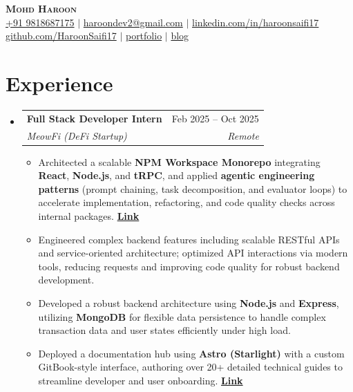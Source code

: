 \documentclass[letterpaper,11pt]{article}
\makeatletter
\newcommand{\resumeItem}[1]{
  \item\small{
    {#1 \vspace{-2pt}}
  }
}
\newcommand{\resumeSubheading}[4]{
  \vspace{-2pt}\item
    \begin{tabular*}{0.97\textwidth}[t]{l@{\extracolsep{\fill}}r}
      \textbf{#1} & #2 \\
      \textit{\small#3} & \textit{\small #4} \\
    \end{tabular*}\vspace{-7pt}
}
\newcommand{\resumeSubHeadingListStart}{\begin{itemize}[leftmargin=0.15in, label={}]}
\newcommand{\resumeSubHeadingListEnd}{\end{itemize}}
\newcommand{\resumeItemListStart}{\begin{itemize}}
\newcommand{\resumeItemListEnd}{\end{itemize}\vspace{-5pt}}
\makeatother
\begin{document}
\begin{center}
    \textbf{\Huge \scshape Mohd Haroon} \\ \vspace{3pt}
    \small \href{tel:+919818687175}{+91 9818687175} $|$
    \href{mailto:haroondev2@gmail.com}{haroondev2@gmail.com} $|$
    \href{https://linkedin.com/in/haroonsaifi17}{linkedin.com/in/haroonsaifi17} \\ \vspace{2pt}
    \href{https://github.com/HaroonSaifi17}{github.com/HaroonSaifi17} $|$
    \href{https://portfolio-v4-roan.vercel.app/}{portfolio} $|$
    \href{https://portfolio-v4-roan.vercel.app/blog}{blog}
\end{center}

\vspace{-1.5em}

\section{Experience}
  \resumeSubHeadingListStart

    \resumeSubheading
      {Full Stack Developer Intern}{Feb 2025 -- Oct 2025}
      {MeowFi (DeFi Startup)}{Remote}
    \resumeItemListStart
        \resumeItem{Architected a scalable \textbf{NPM Workspace Monorepo} integrating \textbf{React}, \textbf{Node.js}, and \textbf{tRPC}, and applied \textbf{agentic engineering patterns} (prompt chaining, task decomposition, and evaluator loops) to accelerate implementation, refactoring, and code quality checks across internal packages. \hfill \href{https://portfolio-v4-roan.vercel.app/case-studies/meowfi-dapp}{\textbf{Link}}}
        \resumeItem{Engineered complex backend features including scalable RESTful APIs and service-oriented architecture; optimized API interactions via modern tools, reducing requests and improving code quality for robust backend development.}
        \resumeItem{Developed a robust backend architecture using \textbf{Node.js} and \textbf{Express}, utilizing \textbf{MongoDB} for flexible data persistence to handle complex transaction data and user states efficiently under high load.}
        \resumeItem{Deployed a documentation hub using \textbf{Astro (Starlight)} with a custom GitBook-style interface, authoring over 20+ detailed technical guides to streamline developer and user onboarding. \hfill \href{https://docs.meowfi.xyz}{\textbf{Link}}}
    \resumeItemListEnd

  \resumeSubHeadingListEnd
\end{document}
